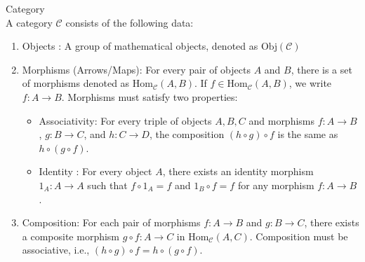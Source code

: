 \begin{definition}{Category}\\
A category $\mathcal{C}$ consists of the following data:
\begin{enumerate}
	\item Objects : A group of mathematical objects, denoted as $\text{Obj}(\mathcal{C})$
	\item Morphisms (Arrows/Maps): For every pair of objects $A$ and $B$, there is a set of morphisms denoted as $\text{Hom}_{\mathcal{C}}(A, B)$. If $f \in \text{Hom}_{\mathcal{C}}(A, B)$, we write $f: A \to B$. Morphisms must satisfy two properties:
	\begin{itemize}
		\item Associativity: For every triple of objects $A, B, C$ and morphisms $f: A \to B$, $g: B \to C$, and $h: C \to D$, the composition $(h \circ g) \circ f$ is the same as $h \circ (g \circ f)$.
		\item Identity : For every object $A$, there exists an identity morphism $1_A: A \to A$ such that $f \circ 1_A = f$ and $1_B \circ f = f$ for any morphism $f: A \to B$.
	\end{itemize}
	\item Composition: For each pair of morphisms $f: A \to B$ and $g: B \to C$, there exists a composite morphism $g \circ f: A \to C$ in $\text{Hom}_{\mathcal{C}}(A, C)$. Composition must be associative, i.e., $(h \circ g) \circ f = h \circ (g \circ f)$.
\end{enumerate}
\end{definition}




